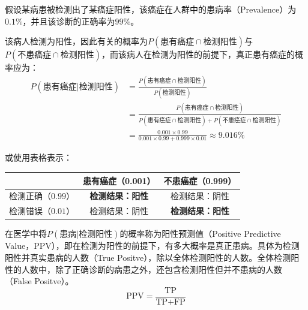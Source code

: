 \documentclass[11pt]{article}
\begin{document}
\begin{example}
    假设某病患被检测出了某癌症阳性，该癌症在人群中的患病率（Prevalence）为$0.1\%$，并且该诊断的正确率为$99\%$。
    \begin{figure}[ht!]
    \centering
    \end{figure}

    该病人检测为阳性，因此有关的概率为$P(\text{患有癌症} \cap \text{检测阳性})$与$P(\text{不患癌症} \cap \text{检测阳性})$，而该病人在检测为阳性的前提下，真正患有癌症的概率应为：
    \begin{align*}
        P(\text{患有癌症}|\text{检测阳性}) &= \frac{P(\text{患有癌症} \cap \text{检测阳性})}{P(\text{检测阳性})} \\
        &= \frac{P(\text{患有癌症} \cap \text{检测阳性})}{P(\text{患有癌症} \cap \text{检测阳性}) + P(\text{不患癌症} \cap \text{检测阳性})} \\
        &= \frac{0.001 \times 0.99}{0.001\times 0.99 + 0.999\times 0.01} \approx 9.016\% 
    \end{align*}

    或使用表格表示：
    \begin{table}[ht!]
    \centering
    \begin{tabular}{@{}lcc@{}} \toprule
    & 患有癌症（0.001） & 不患癌症（0.999） \\ \midrule
    检测正确（$0.99$）& \textbf{检测结果：阳性} & 检测结果：阴性 \\
    检测错误（$0.01$）& 检测结果：阴性 & \textbf{检测结果：阳性} \\ \bottomrule
    \end{tabular}
    \end{table}

    \begin{remark}
        在医学中将$P(\text{患病}|\text{检测阳性})$的概率称为阳性预测值（Positive Predictive Value，PPV），即在检测为阳性的前提下，有多大概率是真正患病。具体为检测阳性并真实患病的人数（True Positve），除以全体检测阳性的人数。全体检测阳性的人数中，除了正确诊断的病患之外，还包含检测阳性但并不患病的人数（False Positve）。
        \begin{equation*}
            \text{PPV} = \frac{\text{TP}}{\text{TP}+\text{FP}}
        \end{equation*}
        

\end{remark}
\end{example}
\end{document}
